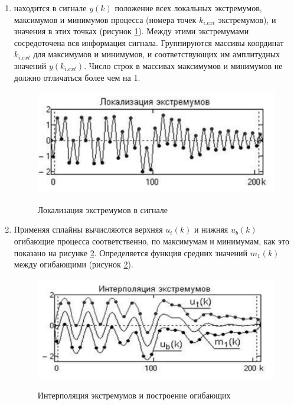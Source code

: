 \documentclass[utf8x, 14pt, oneside, a4paper]{article}
\begin{document}
	\begin{enumerate}
		\item находится в сигнале $y(k)$ положение всех локальных экстремумов, максимумов и минимумов процесса (номера точек $k_{i.ext}$ экстремумов), и значения в этих точках (рисунок \ref{ris:huang_local_extr}). Между этими экстремумами сосредоточена вся информация сигнала. Группируются массивы координат $k_{i.ext}$ для максимумов и минимумов, и соответствующих им амплитудных значений $y(k_{i.ext})$. Число строк в массивах максимумов и минимумов не должно отличаться более чем на 1.
		
		\begin{figure}[h!]
			\begin{center}
				{\includegraphics[scale = 0.9]{img/huang_local_extr.png}}
			\end{center}
			\caption{Локализация экстремумов в сигнале}
			\label{ris:huang_local_extr}
		\end{figure}
		
		\item Применяя сплайны вычисляются верхняя $u_t(k)$ и нижняя $u_b(k)$ огибающие процесса соответственно, по максимумам и минимумам, как это показано на рисунке \ref{ris:huang_interp_extr}. Определяется функция средних значений $m_1(k)$ между огибающими (рисунок \ref{ris:huang_interp_extr}).
		
		\begin{figure}[h!]
			\begin{center}
				{\includegraphics[scale = 0.9]{img/huang_interp_extr.png}}
			\end{center}
			\caption{Интерполяция экстремумов и построение огибающих}
			\label{ris:huang_interp_extr}
		\end{figure}
	

\end{enumerate}
\end{document}

